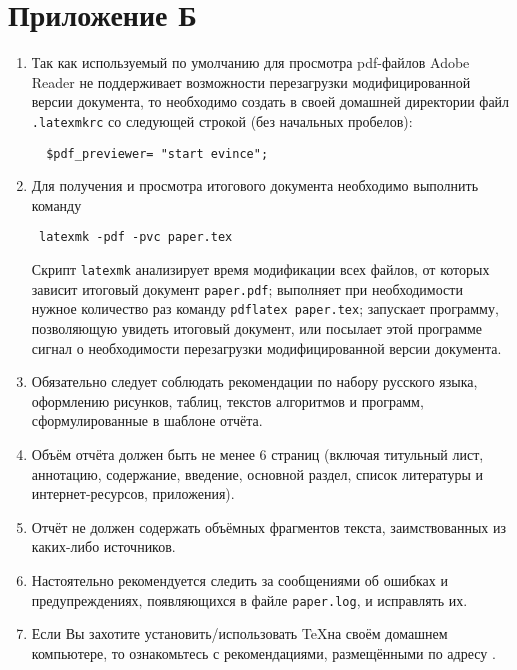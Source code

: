 \section{Приложение Б}

\begin{enumerate}

\item
Так как используемый по умолчанию для просмотра pdf-файлов Adobe Reader не 
поддерживает возможности перезагрузки модифицированной версии документа, то
необходимо создать в своей домашней директории файл \verb|.latexmkrc|
со следующей строкой (без начальных пробелов):

\begin{verbatim}
  $pdf_previewer= "start evince";
\end{verbatim} 

\item
Для получения и просмотра итогового документа необходимо выполнить команду

\begin{verbatim}
 latexmk -pdf -pvc paper.tex
\end{verbatim} 

\noindent
Скрипт \verb|latexmk| анализирует время модификации всех файлов, от которых
зависит итоговый документ \verb|paper.pdf|; выполняет при необходимости
нужное количество раз команду \verb|pdflatex paper.tex|; запускает программу,
позволяющую увидеть итоговый документ, или посылает этой программе
сигнал о необходимости перезагрузки модифицированной версии документа. 

\item
Обязательно следует соблюдать рекомендации по набору русского языка, 
оформлению рисунков, таблиц, текстов алгоритмов и программ, сформулированные
в шаблоне отчёта.

\item
Объём отчёта должен быть не менее
6 страниц (включая титульный лист, аннотацию, содержание, введение,
основной раздел, список литературы и интернет-ресурсов, приложения).

\item
Отчёт не должен содержать объёмных фрагментов текста, заимствованных из
каких-либо источников. 

\item
Настоятельно рекомендуется следить за сообщениями об ошибках и 
предупреждениях, появляющихся в файле \verb|paper.log|, и исправлять их.

\item
Если Вы захотите установить/использовать \TeX на своём домашнем компьютере,
то ознакомьтесь с рекомендациями, размещёнными по адресу
.

\end{enumerate}
